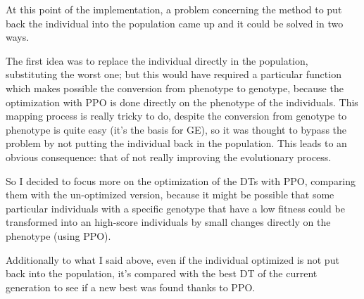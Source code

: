 At this point of the implementation, a problem concerning the method to put back the individual into the population came up and it could be solved in two ways.

The first idea was to replace the individual directly in the population, substituting  the worst one; but this would have required a particular function which makes possible the conversion from phenotype to genotype, because the optimization with PPO is done directly on the phenotype of the individuals. This mapping process is really tricky to do, despite the conversion from genotype to phenotype is quite easy (it's the basis for GE), so it was thought to bypass the problem by not putting the individual back in the population. This leads to an obvious consequence: that of not really improving the evolutionary process.

So I decided to focus more on the optimization of the DTs with PPO, comparing them with the un-optimized version, because it might be possible that some particular individuals with a specific genotype that have a low fitness could be transformed into an high-score individuals by small changes directly on the phenotype (using PPO).

Additionally to what I said above, even if the individual optimized is not put back into the population, it's compared with the best DT of the current generation to see if a new best was found thanks to PPO.

\newpage